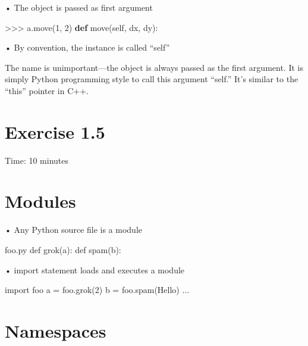 \documentclass[
  letterpaper,
  DIV=11,
  numbers=noendperiod]{scrreprt}
\newenvironment{Shaded}{\begin{snugshade}}{\end{snugshade}}
\newcommand{\DecValTok}[1]{\textcolor[rgb]{0.68,0.00,0.00}{#1}}
\newcommand{\KeywordTok}[1]{\textcolor[rgb]{0.00,0.23,0.31}{\textbf{#1}}}
\newcommand{\NormalTok}[1]{\textcolor[rgb]{0.00,0.23,0.31}{#1}}
\newcommand{\OperatorTok}[1]{\textcolor[rgb]{0.37,0.37,0.37}{#1}}
\newcommand{\VariableTok}[1]{\textcolor[rgb]{0.07,0.07,0.07}{#1}}
\begin{document}
• The object is passed as first argument

\begin{Shaded}
\begin{Highlighting}[]
\OperatorTok{\textgreater{}\textgreater{}\textgreater{}}\NormalTok{ a.move(}\DecValTok{1}\NormalTok{, }\DecValTok{2}\NormalTok{)  }
\KeywordTok{def}\NormalTok{ move(}\VariableTok{self}\NormalTok{, dx, dy): }
\end{Highlighting}
\end{Shaded}

• By convention, the instance is called ``self''

The name is unimportant---the object is always passed as the first
argument. It is simply Python programming style to call this argument
``self.'' It's similar to the ``this'' pointer in C++.


\chapter{Exercise 1.5}\label{exercise-1.5}

Time: 10 minutes


\chapter{Modules}\label{modules}

• Any Python source file is a module

\begin{Shaded}
\begin{Highlighting}[]
\NormalTok{foo.py def grok(a): def spam(b): }
\end{Highlighting}
\end{Shaded}

• import statement loads and executes a module

\begin{Shaded}
\begin{Highlighting}[]
\NormalTok{import foo  }
\NormalTok{a = foo.grok(2)  }
\NormalTok{b = foo.spam(\textquotesingle{}Hello\textquotesingle{})  }
\NormalTok{... }
\end{Highlighting}
\end{Shaded}


\chapter{Namespaces}\label{namespaces}
\end{document}
